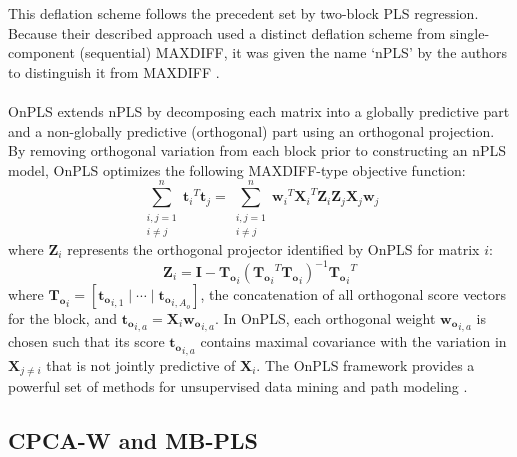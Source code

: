 \begin{doublespace}
This deflation scheme follows the precedent set by two-block PLS regression.
Because their described approach used a distinct deflation scheme from
single-component (sequential) MAXDIFF, it was given the name `nPLS' by
the authors to distinguish it from MAXDIFF
\cite{lofstedt:jchemo2011,lofstedt2012}.
\\\\
OnPLS extends nPLS by decomposing each matrix into a globally predictive
part and a non-globally predictive (orthogonal) part using an orthogonal
projection. By removing orthogonal variation from each block prior to
constructing an nPLS model, OnPLS optimizes the following MAXDIFF-type
objective function:
\begin{equation}
\sum_{\substack{i,j=1\\ i \ne j}}^n
 {\mathbf{t}_i}^T \mathbf{t}_j =
\sum_{\substack{i,j=1\\ i \ne j}}^n
 {\mathbf{w}_i}^T {\mathbf{X}_i}^T \mathbf{Z}_i
  \mathbf{Z}_j \mathbf{X}_j \mathbf{w}_j
\end{equation}
where $\mathbf{Z}_i$ represents the orthogonal projector identified by
OnPLS for matrix $i$:
\begin{equation*}
\mathbf{Z}_i = \mathbf{I} - \mathbf{T_o}_i \left(
  {\mathbf{T_o}_i}^T \mathbf{T_o}_i
 \right)^{-1} {\mathbf{T_o}_i}^T
\end{equation*}
where
$\mathbf{T_o}_i = [\mathbf{t_o}_{i,1}\mid\cdots\mid\mathbf{t_o}_{i,A_o}]$,
the concatenation of all orthogonal score vectors for the block, and
$\mathbf{t_o}_{i,a} = \mathbf{X}_i \mathbf{w_o}_{i,a}$. In OnPLS, each
orthogonal weight $\mathbf{w_o}_{i,a}$ is chosen such that its score
$\mathbf{t_o}_{i,a}$ contains maximal covariance with the variation in
$\mathbf{X}_{j \ne i}$ that is not jointly predictive of $\mathbf{X}_i$.
The OnPLS framework provides a powerful set of methods for unsupervised
data mining and path modeling \cite{lofstedt:jchemo2011,lofstedt:jchemo2012,
  lofstedt:cils2012,lofstedt:aca2013}.
\end{doublespace}

\subsection{CPCA-W and MB-PLS}

